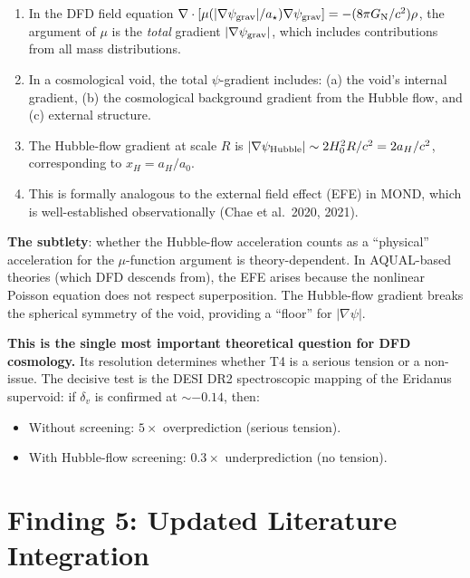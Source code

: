 \documentclass[11pt,a4paper]{article}
\newcommand{\Hzero}{H_0}
\newcommand{\aM}{a_0}
\newcommand{\mufd}{\mu}
\newcommand{\psigrav}{\psi_{\rm grav}}
\newcommand{\GN}{G_{\rm N}}
\begin{document}
\begin{enumerate}
\item In the DFD field equation
  $\nabla\cdot[\mufd(|\nabla\psigrav|/a_\star)\nabla\psigrav]
  = -(8\pi\GN/c^2)\rho$, the argument of $\mufd$ is the
  \emph{total} gradient $|\nabla\psigrav|$, which includes
  contributions from all mass distributions.

\item In a cosmological void, the total $\psi$-gradient includes:
  (a) the void's internal gradient, (b) the cosmological background
  gradient from the Hubble flow, and (c) external structure.

\item The Hubble-flow gradient at scale $R$ is
  $|\nabla\psi_{\rm Hubble}| \sim 2\Hzero^2 R/c^2 = 2a_H/c^2$,
  corresponding to $x_H = a_H/\aM$.

\item This is formally analogous to the external field effect (EFE)
  in MOND, which is well-established observationally (Chae et al.\
  2020, 2021).
\end{enumerate}

\textbf{The subtlety}: whether the Hubble-flow acceleration counts
as a ``physical'' acceleration for the $\mufd$-function argument is
theory-dependent. In AQUAL-based theories (which DFD descends from),
the EFE arises because the nonlinear Poisson equation does not
respect superposition. The Hubble-flow gradient breaks the
spherical symmetry of the void, providing a ``floor'' for $|\nabla\psi|$.

\textbf{This is the single most important theoretical question for
DFD cosmology.} Its resolution determines whether T4 is a serious
tension or a non-issue. The decisive test is the DESI DR2
spectroscopic mapping of the Eridanus supervoid: if $\delta_v$ is
confirmed at $\sim -0.14$, then:
\begin{itemize}[nosep]
\item Without screening: $5\times$ overprediction (serious tension).
\item With Hubble-flow screening: $0.3\times$ underprediction (no tension).
\end{itemize}


\part{Finding 5: Updated Literature Integration}
\label{part:literature}
\end{document}
